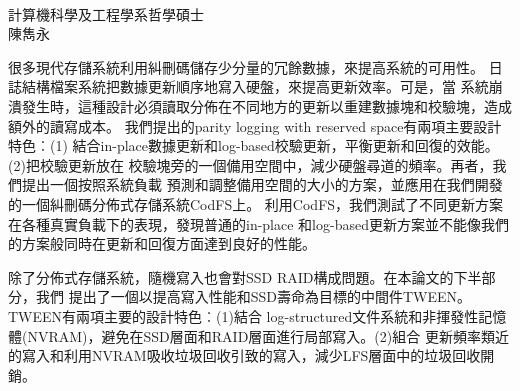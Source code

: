\\
計算機科學及工程學系哲學碩士\\
陳雋永

\vspace{1cm}

很多現代存儲系統利用糾刪碼儲存少分量的冗餘數據，來提高系統的可用性。
日誌結構檔案系統把數據更新順序地寫入硬盤，來提高更新效率。可是，當
系統崩潰發生時，這種設計必須讀取分佈在不同地方的更新以重建數據塊和校驗塊，造成額外的讀寫成本。
我們提出的parity logging with reserved space有兩項主要設計特色︰(1)
結合in-place數據更新和log-based校驗更新，平衡更新和回復的效能。(2)把校驗更新放在
校驗塊旁的一個備用空間中，減少硬盤尋道的頻率。再者，我們提出一個按照系統負載
預測和調整備用空間的大小的方案，並應用在我們開發的一個糾刪碼分佈式存儲系統CodFS上。
利用CodFS，我們測試了不同更新方案在各種真實負載下的表現，發現普通的in-place
和log-based更新方案並不能像我們的方案般同時在更新和回復方面達到良好的性能。

除了分佈式存儲系統，隨機寫入也會對SSD RAID構成問題。在本論文的下半部分，我們
提出了一個以提高寫入性能和SSD壽命為目標的中間件TWEEN。TWEEN有兩項主要的設計特色︰(1)結合
log-structured文件系統和非揮發性記憶體(NVRAM)，避免在SSD層面和RAID層面進行局部寫入。(2)組合
更新頻率類近的寫入和利用NVRAM吸收垃圾回收引致的寫入，減少LFS層面中的垃圾回收開銷。
